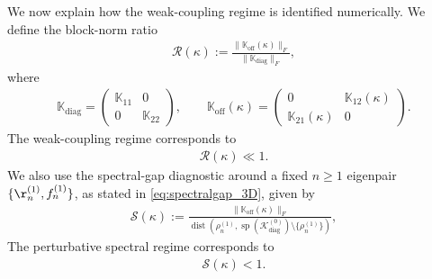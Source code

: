 \documentclass[10pt]{article}
\numberwithin{equation}{section}
\begin{document}
We now explain how the weak-coupling regime is identified numerically. We define the block-norm ratio
\begin{align}\label{eq:ratio_blocks_3D}
    \mathcal R(\kappa) :=
    \frac{ \|\mathbb K_{\mathrm{off}}(\kappa)\|_F }{ \|\mathbb K_{\mathrm{diag}}\|_F },
\end{align}
where
\begin{align*}
    \mathbb K_{\mathrm{diag}} =
    \begin{pmatrix}
        \mathbb K_{11} & 0\\
        0 & \mathbb K_{22}
    \end{pmatrix},
    \qquad
    \mathbb K_{\mathrm{off}}(\kappa) =
    \begin{pmatrix}
        0 & \mathbb K_{12}(\kappa)\\
        \mathbb K_{21}(\kappa) & 0
    \end{pmatrix}.
\end{align*}
The weak-coupling regime corresponds to
\begin{align}
    \mathcal R(\kappa)\ll1.
\end{align}
We also use the spectral-gap diagnostic around a fixed $n\geq1$ eigenpair $\{ \r_n^{(1)}, f_n^{(1)} \}$, as stated in \eqref{eq:spectralgap_3D}, given by
\begin{align}\label{eq:spectral_gap_ratio_3D}
    \mathcal S(\kappa) :=
    \frac{ \|\mathbb K_{\mathrm{off}}(\kappa)\|_F }{ \operatorname{dist} \left( \rho_n^{(1)}, \operatorname{sp}(\mathcal K_{\mathrm{diag}}^{(0)}) \setminus \{\rho_n^{(1)}\} \right) },
\end{align}
The perturbative spectral regime corresponds to
\begin{align}
    \mathcal S(\kappa)<1.
\end{align}
\end{document}

